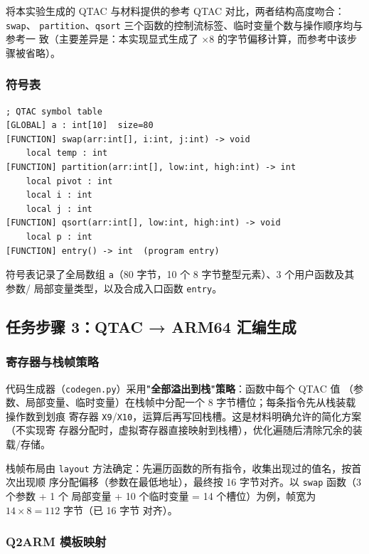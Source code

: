 \documentclass[12pt,a4paper]{ctexart}
\begin{document}
将本实验生成的 QTAC 与材料提供的参考 QTAC 对比，两者结构高度吻合：\texttt{swap}、
\texttt{partition}、\texttt{qsort} 三个函数的控制流标签、临时变量个数与操作顺序均与参考一
致（主要差异是：本实现显式生成了 $\times 8$ 的字节偏移计算，而参考中该步骤被省略）。

\subsubsection{符号表}

\begin{lstlisting}[language={}, caption={qsort.sym}]
; QTAC symbol table
[GLOBAL] a : int[10]  size=80
[FUNCTION] swap(arr:int[], i:int, j:int) -> void
    local temp : int
[FUNCTION] partition(arr:int[], low:int, high:int) -> int
    local pivot : int
    local i : int
    local j : int
[FUNCTION] qsort(arr:int[], low:int, high:int) -> void
    local p : int
[FUNCTION] entry() -> int  (program entry)
\end{lstlisting}

符号表记录了全局数组 \texttt{a}（80 字节，10 个 8 字节整型元素）、3 个用户函数及其参数/
局部变量类型，以及合成入口函数 \texttt{entry}。

\subsection{任务步骤 3：QTAC → ARM64 汇编生成}

\subsubsection{寄存器与栈帧策略}

代码生成器（\texttt{codegen.py}）采用\textbf{"全部溢出到栈"策略}：函数中每个 QTAC 值
（参数、局部变量、临时变量）在栈帧中分配一个 8 字节槽位；每条指令先从栈装载操作数到划痕
寄存器 \texttt{X9}/\texttt{X10}，运算后再写回栈槽。这是材料明确允许的简化方案（不实现寄
存器分配时，虚拟寄存器直接映射到栈槽），优化遍随后清除冗余的装载/存储。

栈帧布局由 \texttt{layout} 方法确定：先遍历函数的所有指令，收集出现过的值名，按首次出现顺
序分配偏移（参数在最低地址），最终按 16 字节对齐。以 \texttt{swap} 函数（3 个参数 + 1 个
局部变量 + 10 个临时变量 = 14 个槽位）为例，帧宽为 $14 \times 8 = 112$ 字节（已 16 字节
对齐）。

\subsubsection{Q2ARM 模板映射}
\end{document}
